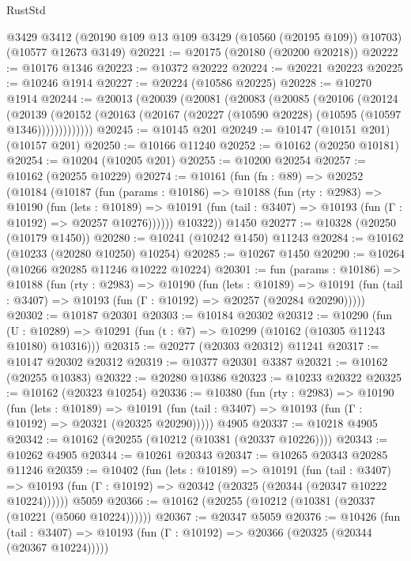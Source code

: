 \begin{lexlean}{RustStd}
\begin{coremodule}
    @3429
    @3412
    (@20190 @109 @13 @109 @3429 (@10560 (@20195 @109)) @10703)
    (@10577 @12673 @3149)
@20221 := @20175 (@20180 (@20200 @20218))
@20222 := @10176 @1346
@20223 := @10372 @20222
@20224 := @20221 @20223
@20225 := @10246 @1914
@20227 := @20224 (@10586 @20225)
@20228 := @10270 @1914
@20244 := @20013
    (@20039
      (@20081
        (@20083
          (@20085
            (@20106
              (@20124
                (@20139
                  (@20152 (@20163 (@20167 (@20227 (@10590 @20228) (@10595 (@10597 @1346)))))))))))))
@20245 := @10145 @201
@20249 := @10147 (@10151 @201) (@10157 @201)
@20250 := @10166 @11240
@20252 := @10162 (@20250 @10181)
@20254 := @10204 (@10205 @201)
@20255 := @10200 @20254
@20257 := @10162 (@20255 @10229)
@20274 := @10161
    (fun (fn : @89) =>
    @20252
      (@10184
        (@10187
          (fun (params : @10186) =>
          @10188
            (fun (rty : @2983) =>
            @10190
              (fun (lets : @10189) =>
              @10191 (fun (tail : @3407) => @10193 (fun (Γ : @10192) => @20257 @10276))))))
        @10322))
    @1450
@20277 := @10328 (@20250 (@10179 @1450))
@20280 := @10241 (@10242 @1450) @11243
@20284 := @10162 (@10233 (@20280 @10250) @10254)
@20285 := @10267 @1450
@20290 := @10264 (@10266 @20285 @11246 @10222 @10224)
@20301 := fun (params : @10186) =>
  @10188
    (fun (rty : @2983) =>
    @10190
      (fun (lets : @10189) =>
      @10191 (fun (tail : @3407) => @10193 (fun (Γ : @10192) => @20257 (@20284 @20290)))))
@20302 := @10187 @20301
@20303 := @10184 @20302
@20312 := @10290
    (fun (U : @10289) => @10291 (fun (t : @7) => @10299 (@10162 (@10305 @11243 @10180) @10316)))
@20315 := @20277 (@20303 @20312) @11241
@20317 := @10147 @20302 @20312
@20319 := @10377 @20301 @3387
@20321 := @10162 (@20255 @10383)
@20322 := @20280 @10386
@20323 := @10233 @20322
@20325 := @10162 (@20323 @10254)
@20336 := @10380
    (fun (rty : @2983) =>
    @10190
      (fun (lets : @10189) =>
      @10191 (fun (tail : @3407) => @10193 (fun (Γ : @10192) => @20321 (@20325 @20290)))))
    @4905
@20337 := @10218 @4905
@20342 := @10162 (@20255 (@10212 (@10381 (@20337 @10226))))
@20343 := @10262 @4905
@20344 := @10261 @20343
@20347 := @10265 @20343 @20285 @11246
@20359 := @10402
    (fun (lets : @10189) =>
    @10191
      (fun (tail : @3407) =>
      @10193 (fun (Γ : @10192) => @20342 (@20325 (@20344 (@20347 @10222 @10224))))))
    @5059
@20366 := @10162 (@20255 (@10212 (@10381 (@20337 (@10221 (@5060 @10224))))))
@20367 := @20347 @5059
@20376 := @10426
    (fun (tail : @3407) => @10193 (fun (Γ : @10192) => @20366 (@20325 (@20344 (@20367 @10224)))))

\end{coremodule}
\end{lexlean}

